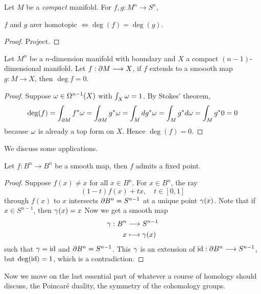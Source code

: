 \begin{theorem}
    Let \(M\) be a \emph{compact} manifold. For \(f,g:M^n \longrightarrow S^n\), \begin{center}
        \(f\) and \(g\) arer homotopic \(\iff \deg(f) = \deg(g)\).
    \end{center}
\end{theorem}
\begin{proof}
    Project.
\end{proof}

\newpage

\begin{proposition}
    Let \(M^n\) be a \(n\)-dimension manifold with boundary and \(X\) a compact \((n-1)\)-dimensional manifold. Let \(f:\partial M\longrightarrow X\), if \(f\) extends to a smoooth map \(g:M\longrightarrow X\), then \(\deg f = 0\).
\end{proposition}
\begin{proof}
    Suppose \(\omega\in\Omega^{n-1}(X)\) with \(\int_X\omega = 1\). By Stokes' theorem, \begin{align*}
        \deg(f) = \int_{\partial M} f^*\omega
        = \int_{\partial M} g^*\omega
        = \int_M dg^*\omega
        = \int_M g^*d\omega
        = \int_M g^*0 = 0
    \end{align*} because \(\omega\) is already a top form on \(X\). Hence \(\deg(f) = 0\).
\end{proof}

We discuss some applications.
\begin{theorem}
    Let \(f:B^n\longrightarrow B^n\) be a smooth map, then \(f\) admits a fixed point.
\end{theorem}
\begin{proof}
    Suppose \(f(x)\neq x\) for all \(x\in B^n\). For \(x\in B^n\), the ray \[
        (1 - t)f(x) + tx,\quad t\in[0,1]
    \] through \(f(x)\) to \(x\) intersects \(\partial B^n = S^{n-1}\) at a unique point \(\gamma(x)\). Note that if \(x\in S^{n-1}\), then \(\gamma(x) = x\) Now we get a smooth map \begin{align*}
        \gamma: B^n &\longrightarrow S^{n-1} \\
        x &\longmapsto \gamma(x)
    \end{align*} such that \(\gamma = \mathrm{id}\) and \(\partial B^n = S^{n-1}\).
    This \(\gamma\) is an extension of \(\mathrm{id}:\partial B^n\longrightarrow S^{n-1}\), but \(\deg(\mathrm{id}) = 1\), which is a contradiction.
\end{proof}

Now we move on the last essential part of whatever a course of homology should discuss, the Poincaré duality, the symmetry of the cohomology groups.

